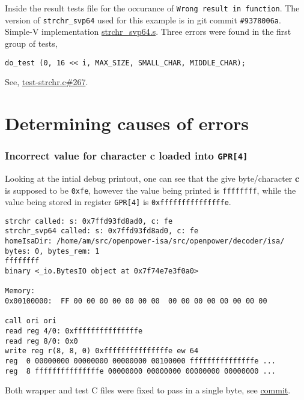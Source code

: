 Inside the result tests file for the occurance of
\texttt{Wrong result in function}.
The version of \texttt{strchr\_svp64} used for this example is in git commit
\texttt{\#9378006a}. Simple-V implementation
\href{https://git.vantosh.com/ngisearch/glibc-svp64/src/commit/9378006a84bdef6af85eb0f810fb62fedc62c588/svp64-port/svp64/strchr_svp64.s}{strchr\_svp64.s}.
Three errors were found in the first group of tests,
\begin{verbatim}
do_test (0, 16 << i, MAX_SIZE, SMALL_CHAR, MIDDLE_CHAR);
\end{verbatim}

See,
\href{https://git.vantosh.com/ngisearch/glibc-svp64/src/commit/9378006a84bdef6af85eb0f810fb62fedc62c588/svp64-port/test-strchr.c#L267}{test-strchr.c\#267}.

\section{Determining causes of errors}
\label{subsec:determine_cause_err}

\subsubsection{Incorrect value for character \textbf{c} loaded into \texttt{GPR[4]}}

Looking at the intial debug printout, one can see that the give byte/character
\textbf{c} is supposed to be \texttt{0xfe}, however the value being printed
is \texttt{ffffffff}, while the value being stored in register \texttt{GPR[4]}
is \texttt{0xfffffffffffffffe}.

\begin{verbatim}
strchr called: s: 0x7ffd93fd8ad0, c: fe
strchr_svp64 called: s: 0x7ffd93fd8ad0, c: fe
homeIsaDir: /home/am/src/openpower-isa/src/openpower/decoder/isa/
bytes: 0, bytes_rem: 1
ffffffff
binary <_io.BytesIO object at 0x7f74e7e3f0a0>

Memory:
0x00100000:  FF 00 00 00 00 00 00 00  00 00 00 00 00 00 00 00

call ori ori
read reg 4/0: 0xfffffffffffffffe
read reg 8/0: 0x0
write reg r(8, 8, 0) 0xfffffffffffffffe ew 64
reg  0 00000000 00000000 00000000 00100000 fffffffffffffffe ...
reg  8 fffffffffffffffe 00000000 00000000 00000000 00000000 ...
\end{verbatim}

Both wrapper and test C files were fixed to pass in a single byte, see
\href{https://git.vantosh.com/ngisearch/glibc-svp64/commit/8f1b25340ee2f108027a6f50e365d42aeb7cc939}{commit}.


